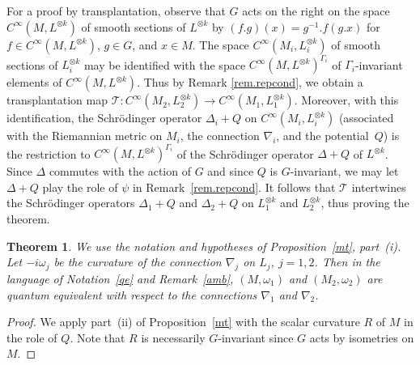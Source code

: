 \documentclass[12pt,leqno]{amsart}%
\newtheorem{theorem}{Theorem}[section]
\theoremstyle{definition}
\theoremstyle{remark}
\numberwithin{equation}{section}
\def\G{{\Gamma}}
\def\E{{\mathcal{E}}}
\def\nab{{\nabla}}
\def\E{{\mathcal{E}}}
\def\Lk{{L^{\otimes k}}}
\def\Lik{{L_i^{\otimes k}}}
\def\Lok{{L_1^{\otimes k}}}
\def\Ltk{{L_2^{\otimes k}}}
\begin{document}
For a proof by transplantation, observe that $G$ acts on the right on the space
${C^\infty}(M,{L^{\otimes k}})$ of smooth sections of ${L^{\otimes k}}$ by
$(f.g)(x)=g^{-1}.f(g.x)$ for $f\in{C^\infty}(M,{L^{\otimes k}})$, $g\in G$, and
$x\in M$. The space ${C^\infty}(M_i,{L_{i}^{\otimes k}})$ of smooth sections of
${L_{i}^{\otimes k}}$ may be identified with the space
${C^\infty}(M,{L^{\otimes k}})^{{\Gamma}_{i}}$ of ${\Gamma}_{i}$-invariant
elements of ${C^\infty}(M,{L^{\otimes k}})$. Thus by Remark \ref{rem.repcond},
we obtain a transplantation map $\mathcal{T}:{C^\infty}(M_2,{L_{2}^{\otimes
k}})\rightarrow{C^\infty}(M_1,{L_{1}^{\otimes k}})$.
Moreover, with this identification, the Schr\"{o}dinger operator $\Delta_{i}+Q$
on ${C^\infty}(M_i,{L_{i}^{\otimes k}})$ (associated with the Riemannian metric
on $M_{i}$, the connection ${\nabla}_{i}$, and the potential~$Q$) is the
restriction to ${C^\infty}(M,{L^{\otimes k}})^{{\Gamma}_{i}}$ of the
Schr\"{o}dinger operator $\Delta+Q$ of ${L^{\otimes k}}$. Since $\Delta$
commutes with the action of $G$ and since $Q$ is $G$-invariant, we may let
$\Delta+Q$ play the role of $\psi$ in Remark~\ref{rem.repcond}. It follows that
$\mathcal{T}$ intertwines the Schr\"{o}dinger operators $\Delta_{1}+Q$ and
$\Delta_{2}+Q$ on ${L_{1}^{\otimes k}}$ and ${L_{2}^{\otimes k}}$, thus proving
the theorem.

\begin{theorem}
\label{mc}
We use the notation and hypotheses of Proposition~\ref{mt}, part~(i).  Let
$-i\omega_j$ be the curvature of the connection $\nab_j$ on $L_j$, $j=1,2$.
Then
in the language of Notation~\ref{qe} and Remark~\ref{amb}, $(M,\omega_1)$ and
$(M_2,\omega_2)$ are quantum equivalent with respect to the connections
$\nab_1$ and $\nab_2$.
\end{theorem}

\begin{proof}  We apply part~(ii) of Proposition~\ref{mt} with the scalar
curvature $R$ of $M$ in the role of $Q$.  Note that $R$ is necessarily
$G$-invariant since $G$ acts by isometries on $M$.
\end{proof}
\end{document}
